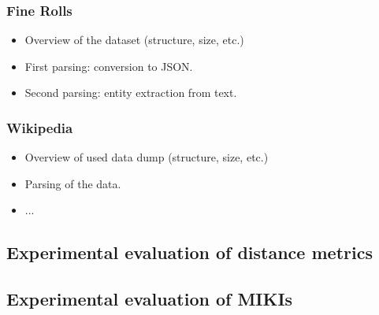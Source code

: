 \documentclass[paper=a4, fontsize=11pt]{scrartcl}
\begin{document}
\subsubsection{Fine Rolls}

\begin{itemize}
	\item Overview of the dataset (structure, size, etc.)
	\item First parsing: conversion to JSON.
	\item Second parsing: entity extraction from text.
\end{itemize}


\subsubsection{Wikipedia}
	
\begin{itemize}
	\item Overview of used data dump (structure, size, etc.)
	\item Parsing of the data.
	\item ...
\end{itemize}

\subsection{Experimental evaluation of distance metrics}

\subsection{Experimental evaluation of MIKIs}
\end{document}
